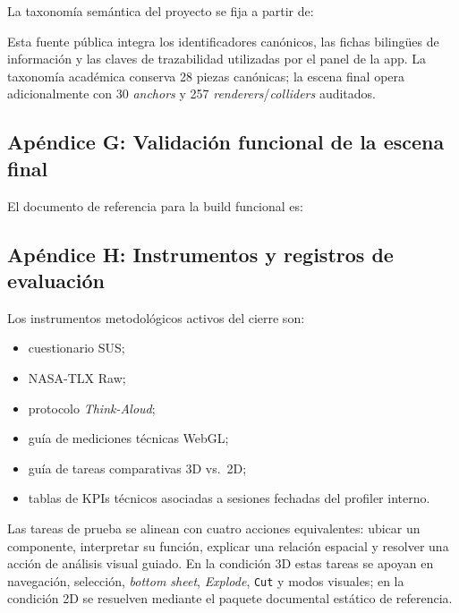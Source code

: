 La taxonomía semántica del proyecto se fija a partir de:
\begin{center}
\small{}
\end{center}

\noindent Esta fuente pública integra los identificadores canónicos, las fichas bilingües de información y las claves de trazabilidad utilizadas por el panel de la app. La taxonomía académica conserva 28 piezas canónicas; la escena final opera adicionalmente con 30 \textit{anchors} y 257 \textit{renderers}/\textit{colliders} auditados.

\subsection*{Apéndice G: Validación funcional de la escena final}

El documento de referencia para la build funcional es:
\begin{center}
\small{}
\end{center}

\subsection*{Apéndice H: Instrumentos y registros de evaluación}

Los instrumentos metodológicos activos del cierre son:
\begin{itemize}
    \item cuestionario SUS;
    \item NASA-TLX Raw;
    \item protocolo \textit{Think-Aloud};
    \item guía de mediciones técnicas WebGL;
    \item guía de tareas comparativas 3D vs.\ 2D;
    \item tablas de KPIs técnicos asociadas a sesiones fechadas del profiler interno.
\end{itemize}

\noindent Las tareas de prueba se alinean con cuatro acciones equivalentes: ubicar un componente, interpretar su función, explicar una relación espacial y resolver una acción de análisis visual guiado. En la condición 3D estas tareas se apoyan en navegación, selección, \textit{bottom sheet}, \textit{Explode}, \texttt{Cut} y modos visuales; en la condición 2D se resuelven mediante el paquete documental estático de referencia.

